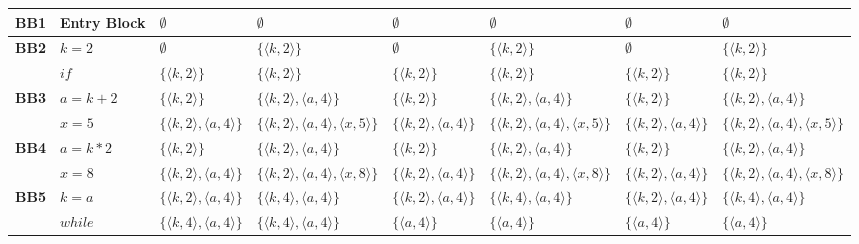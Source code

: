 \documentclass[a4paper, 9pt]{article}
\begin{document}
\begin{table}[htbp]
{\begin{tcolorbox}
\begin{tabularx}{\textwidth}{>{\bfseries}l | >{\centering\arraybackslash}p{1.6cm} | X | X | X | X | X | X}
        BB1 & Entry Block&$\emptyset$& $\emptyset$ & $\emptyset$&  $\emptyset$ & $\emptyset$&  $\emptyset$\\
        \hline
        BB2 & $k = 2$& $\emptyset$& $\{\langle k, 2\rangle\}$& $\emptyset$& $\{\langle k, 2\rangle\}$ & $\emptyset$& $\{\langle k, 2\rangle\}$\\
        \hline
         & $if$ & $\{\langle k, 2\rangle\}$ &$\{\langle k, 2\rangle\}$ & $\{\langle k, 2\rangle\}$ &$\{\langle k, 2\rangle\}$ & $\{\langle k, 2\rangle\}$ &$\{\langle k, 2\rangle\}$ \\
        \hline
        BB3 & $a=k+2$ & $\{\langle k, 2\rangle\}$ &$\{\langle k, 2\rangle, \langle a, 4\rangle\}$ & $\{\langle k, 2\rangle\}$ &$\{\langle k, 2\rangle, \langle a, 4\rangle\}$ & $\{\langle k, 2\rangle\}$ &$\{\langle k, 2\rangle, \langle a, 4\rangle\}$\\
        \hline
         & $x=5$ & $\{\langle k, 2\rangle, \langle a, 4\rangle\}$ &$\{\langle k, 2\rangle, \langle a, 4\rangle, \langle x, 5\rangle\}$ & $\{\langle k, 2\rangle, \langle a, 4\rangle\}$ &$\{\langle k, 2\rangle, \langle a, 4\rangle, \langle x, 5\rangle\}$ & $\{\langle k, 2\rangle, \langle a, 4\rangle\}$ &$\{\langle k, 2\rangle, \langle a, 4\rangle, \langle x, 5\rangle\}$ \\
        \hline
        BB4 & $a=k*2$ & $\{\langle k, 2\rangle\}$ &$\{\langle k, 2\rangle, \langle a, 4\rangle\}$ & $\{\langle k, 2\rangle\}$ &$\{\langle k, 2\rangle, \langle a, 4\rangle\}$ & $\{\langle k, 2\rangle\}$ &$\{\langle k, 2\rangle, \langle a, 4\rangle\}$ \\
        \hline
         & $x=8$ & $\{\langle k, 2\rangle, \langle a, 4\rangle\}$ &$\{\langle k, 2\rangle, \langle a, 4\rangle, \langle x, 8\rangle\}$ & $\{\langle k, 2\rangle, \langle a, 4\rangle\}$ &$\{\langle k, 2\rangle, \langle a, 4\rangle, \langle x, 8\rangle\}$ & $\{\langle k, 2\rangle, \langle a, 4\rangle\}$ &$\{\langle k, 2\rangle, \langle a, 4\rangle, \langle x, 8\rangle\}$ \\
        \hline
        BB5 & $k=a$ & $\{\langle k, 2\rangle, \langle a, 4\rangle\}$ &$\{\langle k, 4\rangle, \langle a, 4\rangle\}$ & $\{\langle k, 2\rangle, \langle a, 4\rangle\}$ &$\{\langle k, 4\rangle, \langle a, 4\rangle\}$ & $\{\langle k, 2\rangle, \langle a, 4\rangle\}$ &$\{\langle k, 4\rangle, \langle a, 4\rangle\}$\\
        \hline
         & $while$ & $\{\langle k, 4\rangle, \langle a, 4\rangle\}$ &$\{\langle k, 4\rangle, \langle a, 4\rangle\}$ & $\{\langle a, 4\rangle\}$ &$\{\langle a, 4\rangle\}$ & $\{\langle a, 4\rangle\}$ &$\{\langle a, 4\rangle\}$\\

\end{tabularx}
\end{tcolorbox}}
\end{table}
\end{document}
